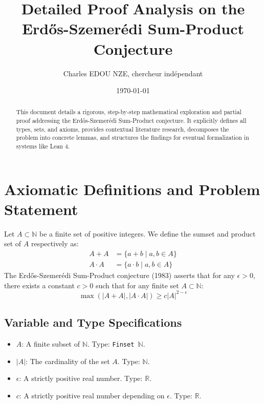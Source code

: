 \documentclass[12pt]{article}
\title{Detailed Proof Analysis on the Erd\H{o}s-Szemer\'edi Sum-Product Conjecture}
\author{Charles EDOU NZE, chercheur ind\'ependant}
\date{\today}
\begin{document}
\maketitle

\begin{abstract}
This document details a rigorous, step-by-step mathematical exploration and partial proof addressing the Erd\H{o}s-Szemer\'edi Sum-Product conjecture. It explicitly defines all types, sets, and axioms, provides contextual literature research, decomposes the problem into concrete lemmas, and structures the findings for eventual formalization in systems like Lean 4.
\end{abstract}

\section{Axiomatic Definitions and Problem Statement}
Let $A \subset \mathbb{N}$ be a finite set of positive integers. We define the sumset and product set of $A$ respectively as:
\begin{align*}
A + A &= \{ a + b \mid a, b \in A \} \\
A \cdot A &= \{ a \cdot b \mid a, b \in A \}
\end{align*}
The Erd\H{o}s-Szemer\'edi Sum-Product conjecture (1983) asserts that for any $\epsilon > 0$, there exists a constant $c > 0$ such that for any finite set $A \subset \mathbb{N}$:
\[
\max(|A + A|, |A \cdot A|) \geq c |A|^{2 - \epsilon}
\]

\subsection{Variable and Type Specifications}
\begin{itemize}
    \item $A$: A finite subset of $\mathbb{N}$. Type: \texttt{Finset $\mathbb{N}$}.
    \item $|A|$: The cardinality of the set $A$. Type: \texttt{$\mathbb{N}$}.
    \item $\epsilon$: A strictly positive real number. Type: \texttt{$\mathbb{R}$}.
    \item $c$: A strictly positive real number depending on $\epsilon$. Type: \texttt{$\mathbb{R}$}.
\end{itemize}
\end{document}
